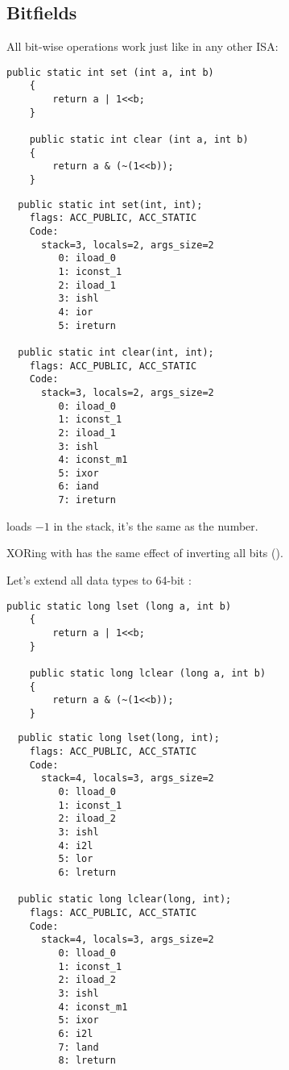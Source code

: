 \subsection{Bitfields}

All bit-wise operations work just like in any other \ac{ISA}:


\begin{lstlisting}[style=customjava]
	public static int set (int a, int b) 
	{
		return a | 1<<b;
	}

	public static int clear (int a, int b) 
	{
		return a & (~(1<<b));
	}
\end{lstlisting}

\begin{lstlisting}
  public static int set(int, int);
    flags: ACC_PUBLIC, ACC_STATIC
    Code:
      stack=3, locals=2, args_size=2
         0: iload_0       
         1: iconst_1      
         2: iload_1       
         3: ishl          
         4: ior           
         5: ireturn       

  public static int clear(int, int);
    flags: ACC_PUBLIC, ACC_STATIC
    Code:
      stack=3, locals=2, args_size=2
         0: iload_0       
         1: iconst_1      
         2: iload_1       
         3: ishl          
         4: iconst_m1     
         5: ixor          
         6: iand          
         7: ireturn       
\end{lstlisting}

 loads $-1$ in the stack, it's the same as the  number.

XORing with  has the same effect of inverting all bits
 ().

Let's extend all data types to 64-bit :


\begin{lstlisting}[style=customjava]
	public static long lset (long a, int b) 
	{
		return a | 1<<b;
	}

	public static long lclear (long a, int b) 
	{
		return a & (~(1<<b));
	}
\end{lstlisting}

\begin{lstlisting}
  public static long lset(long, int);
    flags: ACC_PUBLIC, ACC_STATIC
    Code:
      stack=4, locals=3, args_size=2
         0: lload_0       
         1: iconst_1      
         2: iload_2       
         3: ishl          
         4: i2l           
         5: lor           
         6: lreturn       

  public static long lclear(long, int);
    flags: ACC_PUBLIC, ACC_STATIC
    Code:
      stack=4, locals=3, args_size=2
         0: lload_0       
         1: iconst_1      
         2: iload_2       
         3: ishl          
         4: iconst_m1     
         5: ixor          
         6: i2l           
         7: land          
         8: lreturn       
\end{lstlisting}

